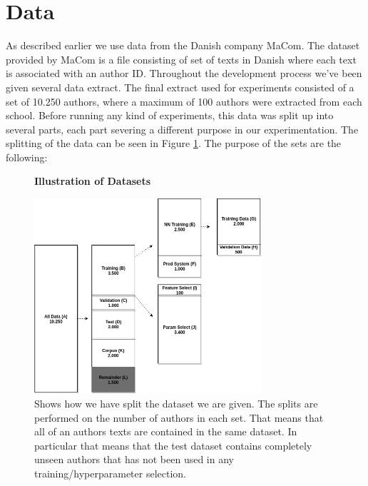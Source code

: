 \section{Data} \label{sec:data}

As described earlier we use data from the Danish company MaCom. The dataset
provided by MaCom is a file consisting of set of texts in Danish where each text
is associated with an author ID. Throughout the development process we've been
given several data extract. The final extract used for experiments consisted
of a set of 10.250 authors, where a maximum of 100 authors were extracted from
each school. Before running any kind of experiments, this data was split up into
several parts, each part severing a different purpose in our experimentation.
The splitting of the data can be seen in Figure \ref{fig:data_split}. The
purpose of the sets are the following:

\begin{figure}
    \centering
    \textbf{Illustration of Datasets}\par\medskip
    \includegraphics[width=0.75\textwidth]{./pictures/data/Data.png}
    \caption{Shows how we have split the dataset we are given. The splits are
        performed on the number of authors in each set. That means that all of
        an authors texts are contained in the same dataset. In particular that
        means that the test dataset contains completely unseen authors that has
        not been used in any training/hyperparameter selection.}
    \label{fig:data_split}
\end{figure}

